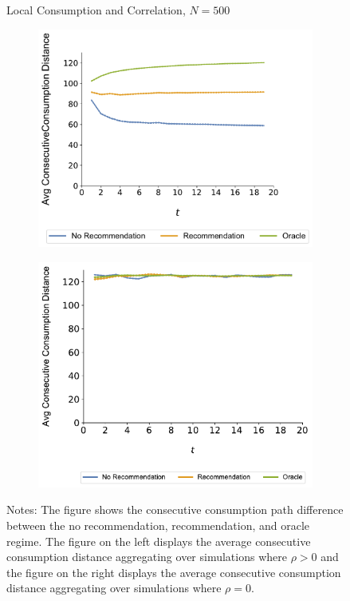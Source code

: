 \documentclass[format=acmsmall, review=true]{acmart}
\begin{document}
\begin{figure}[H]
\caption{Local Consumption and Correlation, $N = 500$}
\begin{subfigure}{.5\linewidth}
  \centering
  \includegraphics[width=.9\linewidth]{figures/rho_pos_consumption_dist_N_500T_20_overall.pdf}
  \label{fig:sfig1}
\end{subfigure}%
\begin{subfigure}{.5\linewidth}
  \centering
  \includegraphics[width=.9\linewidth]{figures/rho_zero_consumption_dist_N_500T_20_overall.pdf}
  \label{fig:sfig2}
\end{subfigure}
\caption*{\scriptsize Notes: The figure shows the consecutive consumption path difference between the no recommendation, recommendation, and oracle regime. The figure on the left displays the average consecutive consumption distance aggregating over simulations where $\rho > 0$ and the figure on the right displays the average consecutive consumption distance aggregating over simulations where $\rho = 0$.}
\label{fig:correlation_consumption_path_n_100}
\end{figure}
\end{document}
